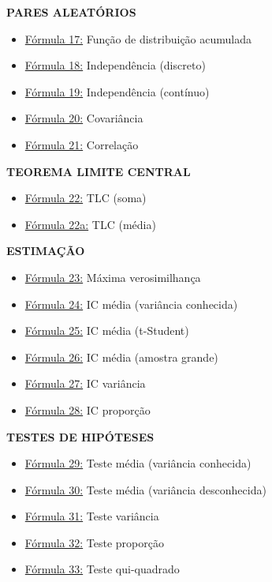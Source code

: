 \documentclass[a4paper,12pt]{article}
\begin{document}
\begin{multicols}{2}
\textbf{\color{sectioncolor}PARES ALEATÓRIOS}
\begin{itemize}[leftmargin=*]
    \item \hyperref[formula17]{\color{formulalink}Fórmula 17:} Função de distribuição acumulada
    \item \hyperref[formula18]{\color{formulalink}Fórmula 18:} Independência (discreto)
    \item \hyperref[formula19]{\color{formulalink}Fórmula 19:} Independência (contínuo)
    \item \hyperref[formula20]{\color{formulalink}Fórmula 20:} Covariância
    \item \hyperref[formula21]{\color{formulalink}Fórmula 21:} Correlação
\end{itemize}

\textbf{\color{sectioncolor}TEOREMA LIMITE CENTRAL}
\begin{itemize}[leftmargin=*]
    \item \hyperref[formula22]{\color{formulalink}Fórmula 22:} TLC (soma)
    \item \hyperref[formula22a]{\color{formulalink}Fórmula 22a:} TLC (média)
\end{itemize}

\textbf{\color{sectioncolor}ESTIMAÇÃO}
\begin{itemize}[leftmargin=*]
    \item \hyperref[formula23]{\color{formulalink}Fórmula 23:} Máxima verosimilhança
    \item \hyperref[formula24]{\color{formulalink}Fórmula 24:} IC média (variância conhecida)
    \item \hyperref[formula25]{\color{formulalink}Fórmula 25:} IC média (t-Student)
    \item \hyperref[formula26]{\color{formulalink}Fórmula 26:} IC média (amostra grande)
    \item \hyperref[formula27]{\color{formulalink}Fórmula 27:} IC variância
    \item \hyperref[formula28]{\color{formulalink}Fórmula 28:} IC proporção
\end{itemize}

\textbf{\color{sectioncolor}TESTES DE HIPÓTESES}
\begin{itemize}[leftmargin=*]
    \item \hyperref[formula29]{\color{formulalink}Fórmula 29:} Teste média (variância conhecida)
    \item \hyperref[formula30]{\color{formulalink}Fórmula 30:} Teste média (variância desconhecida)
    \item \hyperref[formula31]{\color{formulalink}Fórmula 31:} Teste variância
    \item \hyperref[formula32]{\color{formulalink}Fórmula 32:} Teste proporção
    \item \hyperref[formula33]{\color{formulalink}Fórmula 33:} Teste qui-quadrado
\end{itemize}


\end{multicols}
\end{document}
